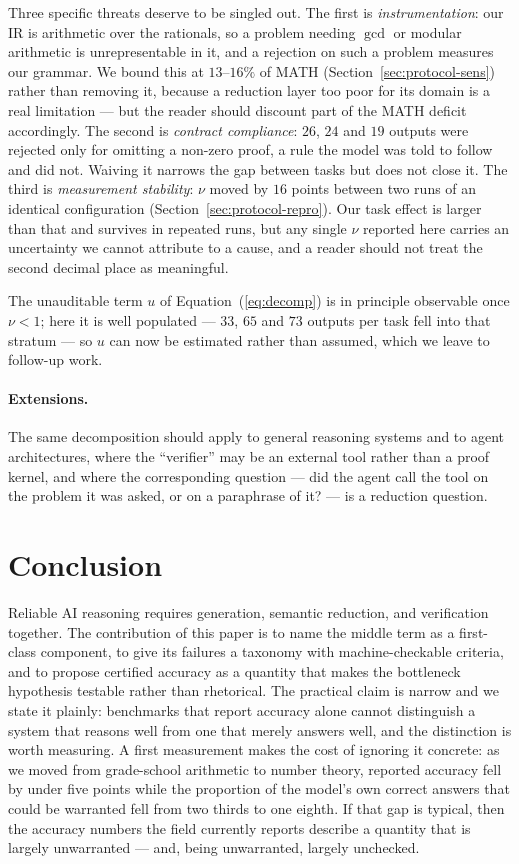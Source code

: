 \documentclass[11pt,a4paper]{article}
\begin{document}
Three specific threats deserve to be singled out.  The first is
\emph{instrumentation}: our IR is arithmetic over the rationals, so a problem
needing $\gcd$ or modular arithmetic is unrepresentable in it, and a rejection on
such a problem measures our grammar.  We bound this at $13$--$16\%$ of MATH
(Section~\ref{sec:protocol-sens}) rather than removing it, because a reduction
layer too poor for its domain is a real limitation --- but the reader should
discount part of the MATH deficit accordingly.  The second is \emph{contract
compliance}: $26$, $24$ and $19$ outputs were rejected only for omitting a
non-zero proof, a rule the model was told to follow and did not.  Waiving it
narrows the gap between tasks but does not close it.  The third is
\emph{measurement stability}: $\nu$ moved by $16$ points between two runs of an
identical configuration (Section~\ref{sec:protocol-repro}).  Our task effect is
larger than that and survives in repeated runs, but any single $\nu$ reported
here carries an uncertainty we cannot attribute to a cause, and a reader should
not treat the second decimal place as meaningful.

The unauditable term $u$ of Equation~(\ref{eq:decomp}) is in principle observable
once $\nu < 1$; here it is well populated --- $33$, $65$ and $73$ outputs per
task fell into that stratum --- so $u$ can now be estimated rather than assumed,
which we leave to follow-up work.

\paragraph{Extensions.}
The same decomposition should apply to general reasoning systems and to agent
architectures, where the ``verifier'' may be an external tool rather than a
proof kernel, and where the corresponding question --- did the agent call the
tool on the problem it was asked, or on a paraphrase of it? --- is a reduction
question.

\section{Conclusion}

Reliable AI reasoning requires generation, semantic reduction, and verification
together.  The contribution of this paper is to name the middle term as a
first-class component, to give its failures a taxonomy with machine-checkable
criteria, and to propose certified accuracy as a quantity that makes the
bottleneck hypothesis testable rather than rhetorical.  The practical claim is
narrow and we state it plainly: benchmarks that report accuracy alone cannot
distinguish a system that reasons well from one that merely answers well, and
the distinction is worth measuring.  A first measurement makes the cost of
ignoring it concrete: as we moved from grade-school arithmetic to number theory,
reported accuracy fell by under five points while the proportion of the model's
own correct answers that could be warranted fell from two thirds to one eighth.
If that gap is typical, then the accuracy numbers the field currently reports
describe a quantity that is largely unwarranted --- and, being unwarranted,
largely unchecked.



\end{document}
